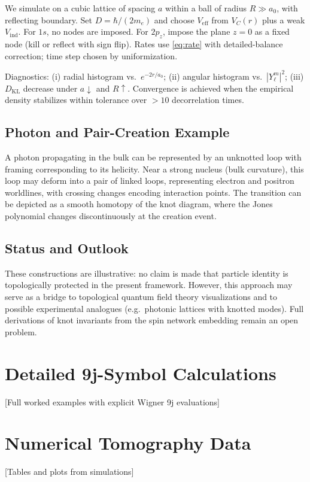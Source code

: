\documentclass[11pt]{article}
\theoremstyle{plain}
\theoremstyle{definition}
\begin{document}
We simulate on a cubic lattice of spacing $a$ within a ball of radius $R\!\gg\!a_0$, with reflecting boundary. Set $D=\hbar/(2m_e)$ and choose $V_{\mathrm{eff}}$ from $V_C(r)$ plus a weak $V_{\mathrm{ind}}$. For $1s$, no nodes are imposed. For $2p_z$, impose the plane $z=0$ as a fixed node (kill or reflect with sign flip). Rates use \eqref{eq:rate} with detailed-balance correction; time step chosen by uniformization.

Diagnostics:
(i) radial histogram vs.\ $e^{-2r/a_0}$;
(ii) angular histogram vs.\ $|Y_\ell^m|^2$;
(iii) $D_{\mathrm{KL}}$ decrease under $a\downarrow$ and $R\uparrow$.
Convergence is achieved when the empirical density stabilizes within tolerance over $>10$ decorrelation times.

\subsection{Photon and Pair-Creation Example}
A photon propagating in the bulk can be represented by an unknotted loop with framing corresponding to its helicity.
Near a strong nucleus (bulk curvature), this loop may deform into a pair of linked loops, representing electron and positron worldlines, with crossing changes encoding interaction points.
The transition can be depicted as a smooth homotopy of the knot diagram, where the Jones polynomial changes discontinuously at the creation event.

\subsection{Status and Outlook}
These constructions are illustrative: no claim is made that particle identity is topologically protected in the present framework.
However, this approach may serve as a bridge to topological quantum field theory visualizations and to possible experimental analogues (e.g.\ photonic lattices with knotted modes).
Full derivations of knot invariants from the spin network embedding remain an open problem.

\section{Detailed 9j-Symbol Calculations}
[Full worked examples with explicit Wigner 9j evaluations]

\section{Numerical Tomography Data}
[Tables and plots from simulations]
\end{document}
